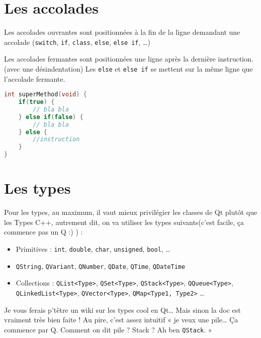 \section{Les accolades}\label{les-accolades}

Les accolades ouvrantes sont positionnées à la fin de la ligne demandant
une accolade (\texttt{switch}, \texttt{if}, \texttt{class}, \texttt{else}, \texttt{else if}, \ldots{})

Les accolades fermantes sont positionnées une ligne après la dernière
instruction. (avec une désindentation) Les \texttt{else} et \texttt{else if} se mettent sur la 
même ligne que l'accolade fermante.


\begin{lstlisting}[language=C++]
int superMethod(void) {     
	if(true) {
		// bla bla     
	} else if(false) {
		// bla bla      
	} else { 
		//instruction 
	}
}
\end{lstlisting}

\section{Les types}\label{les-types}

Pour les types, au maximum, il vaut mieux privilégier les classes de Qt
plutôt que les Types C++, autrement dit, on va utiliser les types
suivants(c'est facile, ça commence pas un Q :) ) :

\begin{itemize}
\itemsep1pt\parskip0pt
\item
  Primitives : \texttt{int}, \texttt{double}, \texttt{char},
  \texttt{unsigned}, \texttt{bool}, \ldots{}
\item
  \texttt{QString}, \texttt{QVariant}, \texttt{QNumber}, \texttt{QDate},
  \texttt{QTime}, \texttt{QDateTime}
\item
  Collections : \texttt{QList\textless{}Type\textgreater{}},
  \texttt{QSet\textless{}Type\textgreater{}},
  \texttt{QStack\textless{}Type\textgreater{}},
  \texttt{QQueue\textless{}Type\textgreater{}},
  \texttt{QLinkedList\textless{}Type\textgreater{}},
  \texttt{QVector\textless{}Type\textgreater{}},
  \texttt{QMap\textless{}Type1, Type2\textgreater{}} \ldots{}
\end{itemize}

Je vous ferais p'têtre un wiki sur les types cool en Qt\ldots{} Mais
sinon la doc est vraiment très bien faite ! Au pire, c'est assez intuitif
« je veux une pile\ldots{} Ça commence par Q. Comment on dit pile ?
Stack ? Ah ben \texttt{QStack}. »

